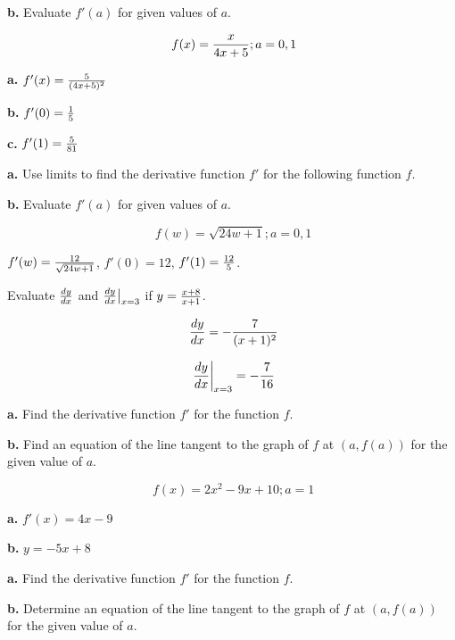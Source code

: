 \par {\bf b.} Evaluate $f'(a)$ for given values of $a$.

$$\
f(x) = {x \over 4x + 5}; a = 0, 1
$$

\par {\bf a.} $f'(x) = {5 \over (4x + 5)^2}$

\par {\bf b.} $f'(0) = {1 \over 5}$

\par {\bf c.} $f'(1) = {5 \over 81}$

\bigskip

\par {\bf a.} Use limits to find the derivative function $f'$ for
the following function $f$.

\par {\bf b.} Evaluate $f'(a)$ for given values of $a$.

$$\
f(w) = \sqrt{24w + 1}; a = 0, 1
$$


\par $f'(w) = {12 \over \sqrt{24w + 1}}$,
$f'(0) = 12$, $f'(1) = {12 \over 5}$.

\bigskip

Evaluate ${dy \over dx}$ and ${dy \over dx}\big|_{x = 3}$
if $y = {x + 8 \over x + 1}$.


$$\
{dy \over dx} = - {7 \over (x + 1)^2}
$$

$$\
{dy \over dx} \bigg|_{x = 3} = - {7 \over 16}
$$

\bigskip

\par {\bf a.} Find the derivative function $f'$ for the
function $f$.

\par {\bf b.} Find an equation of the line tangent to the
graph of $f$ at $(a, f(a))$ for the given value of $a$.

$$\
f(x) = 2x^2 - 9x + 10; a = 1
$$

\par {\bf a.} $f'(x) = 4x - 9$

\par {\bf b.} $y = -5x + 8$

\bigskip

\par {\bf a.} Find the derivative function $f'$ for the
function $f$.
\par {\bf b.} Determine an equation of the line tangent to the
graph of $f$ at $(a, f(a))$ for the given value of $a$.

